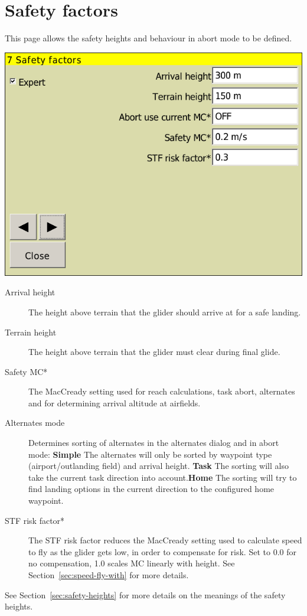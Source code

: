 \section{Safety factors}

This page allows the safety heights and behaviour in abort mode to be defined.

\begin{center}
\includegraphics[angle=0,width=0.8\linewidth,keepaspectratio='true']{figures/config-safety.png}
\end{center}

\begin{description}
\item[Arrival height]  The height above terrain that the glider
  should arrive at for a safe landing.
\item[Terrain height] \label{conf:safetyterrain} The height above terrain that the glider must
  clear during final glide.
\item[Safety MC*]  The MacCready setting used for reach calculations, task abort, alternates and
  for determining arrival altitude at airfields. 
\item[Alternates mode]\label{conf:alternatesmode}
Determines sorting of alternates in the alternates dialog and in abort mode: {\bf Simple} The alternates will only be sorted by waypoint type (airport/outlanding field) and arrival height. {\bf Task} The sorting will also take the current task direction into account.{\bf Home} The sorting will try to find landing options in the current direction to the configured home waypoint.
\item[STF risk factor*] 
  The STF risk factor reduces the MacCready setting used to calculate
  speed to fly as the glider gets low, in order to compensate for
  risk.  Set to 0.0 for no compensation, 1.0 scales MC linearly with
  height.  See Section~\ref{sec:speed-fly-with} for more details.
\end{description}
See Section~\ref{sec:safety-heights} for more details on the meanings
of the safety heights.

